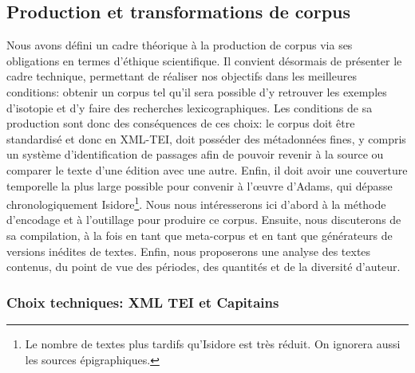 
\subsection{Production et transformations de corpus}

Nous avons défini un cadre théorique à la production de corpus via ses obligations en termes d'éthique scientifique. Il convient désormais de présenter le cadre technique, permettant de réaliser nos objectifs dans les meilleures conditions: obtenir un corpus tel qu'il sera possible d'y retrouver les exemples d'isotopie et d'y faire des recherches lexicographiques. Les conditions de sa production sont donc des conséquences de ces choix: le corpus doit être standardisé et donc en XML-TEI, doit posséder des métadonnées fines, y compris un système d'identification de passages afin de pouvoir revenir à la source ou comparer le texte d'une édition avec une autre. Enfin, il doit avoir une couverture temporelle la plus large possible pour convenir à l'œuvre d'Adams, qui dépasse chronologiquement Isidore\footnote{Le nombre de textes plus tardifs qu'Isidore est très réduit. On ignorera aussi les sources épigraphiques.}. Nous nous intéresserons ici d'abord à la méthode d'encodage et à l'outillage pour produire ce corpus. Ensuite, nous discuterons de sa compilation, à la fois en tant que meta-corpus et en tant que générateurs de versions inédites de textes. Enfin, nous proposerons une analyse des textes contenus, du point de vue des périodes, des quantités et de la diversité d'auteur.


\subsubsection{Choix techniques: XML TEI et Capitains}

